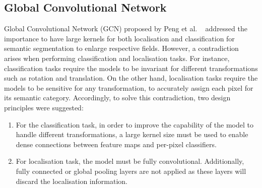 \documentclass[runningheads]{llncs}
\begin{document}
\subsection{Global Convolutional Network}
Global Convolutional Network (GCN) proposed by Peng et al. 
~\cite{Peng2017} addressed the importance to have large kernels for both 
localisation and classification for semantic segmentation to enlarge 
respective fields.
However, a contradiction arises when performing classification and localisation 
tasks. 
For instance, classification tasks require the models to be invariant for 
different transformations such as rotation and translation.
On the other hand, localisation tasks require the models to be sensitive for 
any transformation, to accurately assign each pixel for its semantic category.
Accordingly, to solve this contradiction, two design principles were suggested: 
\begin{enumerate}
	\item For the classification task, in order to improve the capability of 
	the model to handle different transformations, a large kernel size must be 
	used to enable dense connections between feature maps and per-pixel 
	classifiers.
	\item For localisation task, the model must be fully convolutional. 
	Additionally, fully connected or global pooling layers are not applied as 
	these layers will discard the localisation information. 
\end{enumerate}
\end{document}

